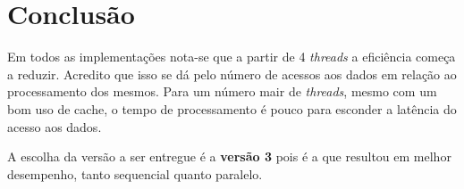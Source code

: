 \chapter{Conclusão}
\label{cha:conclusao}

Em todos as implementações nota-se que a partir de 4 \textit{threads} a eficiência começa a reduzir. Acredito que isso se dá pelo número de acessos aos dados em relação ao processamento dos mesmos. Para um número mair de \textit{threads}, mesmo com um bom uso de cache, o tempo de processamento é pouco para esconder a latência do acesso aos dados.

A escolha da versão a ser entregue é a \textbf{versão 3} pois é a que resultou em melhor desempenho, tanto sequencial quanto paralelo.